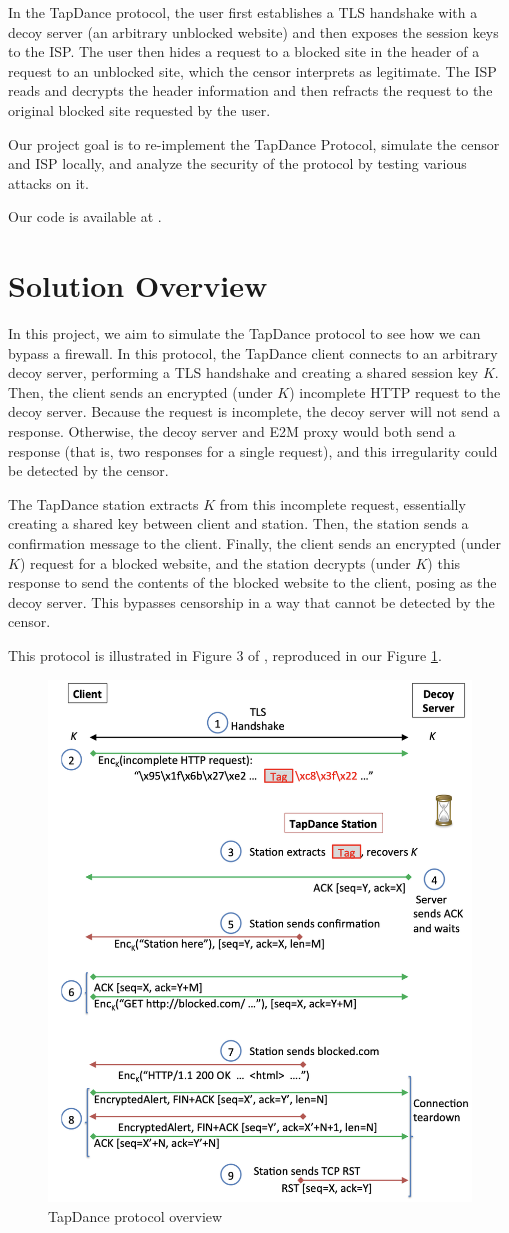 \documentclass[conference]{IEEEtran}
\begin{document}
In the TapDance protocol, the user first establishes a TLS handshake with a decoy server (an arbitrary unblocked website) and then exposes the session keys to the ISP. The user then hides a request to a blocked site in the header of a request to an unblocked site, which the censor interprets as legitimate. The ISP reads and decrypts the header information and then refracts the request to the original blocked site requested by the user.

Our project goal is to re-implement the TapDance Protocol, simulate the censor and ISP locally, and analyze the security of the protocol by testing various attacks on it.

Our code is available at \cite{TapDanceImpl}.

\section{Solution Overview}

In this project, we aim to simulate the TapDance protocol to see how we can bypass a firewall. In this protocol, the TapDance client connects to an arbitrary decoy server, performing a TLS handshake and creating a shared session key $K$. Then, the client sends an encrypted (under $K$) incomplete HTTP request to the decoy server. Because the request is incomplete, the decoy server will not send a response. Otherwise, the decoy server and E2M proxy would both send a response (that is, two responses for a single request), and this irregularity could be detected by the censor.

The TapDance station extracts $K$ from this incomplete request, essentially creating a shared key between client and station. Then, the station sends a confirmation message to the client. Finally, the client sends an encrypted (under $K$) request for a blocked website, and the station decrypts (under $K$) this response to send the contents of the blocked website to the client, posing as the decoy server. This bypasses censorship in a way that cannot be detected by the censor.

This protocol is illustrated in Figure 3 of \cite{tapdance}, reproduced in our Figure \ref{tapdance_overview}.

\begin{figure}[h]
    \centering
    \includegraphics[width=0.5\linewidth]{img/tapdance_fig3.png}
    \caption{TapDance protocol overview}
    \label{tapdance_overview}
\end{figure}
\end{document}
